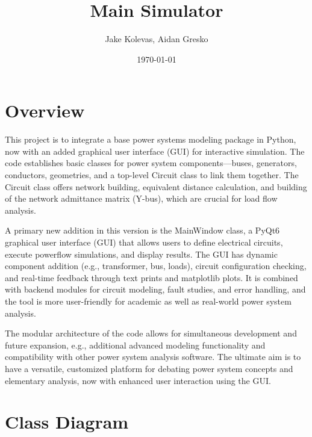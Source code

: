 \documentclass{article}
\author{Jake Kolevas, Aidan Gresko}
\title{Main Simulator}
\date{\today}
\begin{document}
	\maketitle
	
	\section{Overview}
	This project is to integrate a base power systems modeling package in Python, now with an added graphical user interface (GUI) for interactive simulation. The code establishes basic classes for power system components—buses, generators, conductors, geometries, and a top-level Circuit class to link them together. The Circuit class offers network building, equivalent distance calculation, and building of the network admittance matrix (Y-bus), which are crucial for load flow analysis.
	
	A primary new addition in this version is the MainWindow class, a PyQt6 graphical user interface (GUI) that allows users to define electrical circuits, execute powerflow simulations, and display results. The GUI has dynamic component addition (e.g., transformer, bus, loads), circuit configuration checking, and real-time feedback through text prints and matplotlib plots. It is combined with backend modules for circuit modeling, fault studies, and error handling, and the tool is more user-friendly for academic as well as real-world power system analysis.
	
	The modular architecture of the code allows for simultaneous development and future expansion, e.g., additional advanced modeling functionality and compatibility with other power system analysis software. The ultimate aim is to have a versatile, customized platform for debating power system concepts and elementary analysis, now with enhanced user interaction using the GUI.	
	
	\section{Class Diagram}
	
\end{document}
